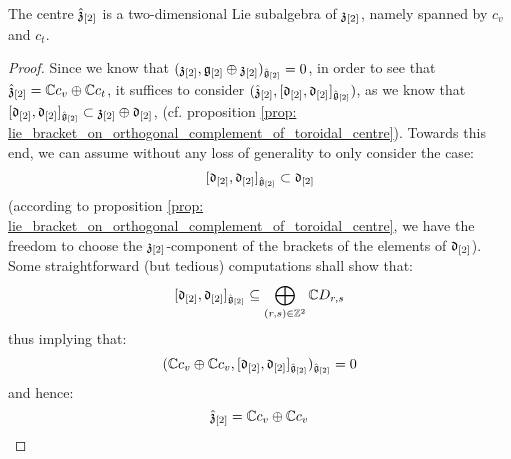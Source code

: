         \begin{proposition} \label{prop: centres_of_extended_toroidal_lie_algebras}
            The centre $\hat{\mathfrak{z}}_{[2]}$ is a two-dimensional Lie subalgebra of $\mathfrak{z}_{[2]}$, namely spanned by $c_v$ and $c_t$. 
        \end{proposition}
            \begin{proof}
                Since we know that $(\mathfrak{z}_{[2]}, \mathfrak{g}_{[2]} \oplus \mathfrak{z}_{[2]})_{\hat{\mathfrak{g}}_{[2]}} = 0$, in order to see that $\hat{\mathfrak{z}}_{[2]} = \mathbb{C} c_v \oplus \mathbb{C} c_t$, it suffices to consider $(\hat{\mathfrak{z}}_{[2]}, [\mathfrak{d}_{[2]}, \mathfrak{d}_{[2]}]_{\hat{\mathfrak{g}}_{[2]}})$, as we know that $[\mathfrak{d}_{[2]}, \mathfrak{d}_{[2]}]_{\hat{\mathfrak{g}}_{[2]}} \subset \mathfrak{z}_{[2]} \oplus \mathfrak{d}_{[2]}$, (cf. proposition \ref{prop: lie_bracket_on_orthogonal_complement_of_toroidal_centre}). Towards this end, we can assume without any loss of generality to only consider the case:
                    $$[\mathfrak{d}_{[2]}, \mathfrak{d}_{[2]}]_{\hat{\mathfrak{g}}_{[2]}} \subset \mathfrak{d}_{[2]}$$
                (according to proposition \ref{prop: lie_bracket_on_orthogonal_complement_of_toroidal_centre}, we have the freedom to choose the $\mathfrak{z}_{[2]}$-component of the brackets of the elements of $\mathfrak{d}_{[2]}$). Some straightforward (but tedious) computations shall show that:
                    $$[\mathfrak{d}_{[2]}, \mathfrak{d}_{[2]}]_{\hat{\mathfrak{g}}_{[2]}} \subseteq \bigoplus_{(r, s) \in \mathbb{Z}^2} \mathbb{C} D_{r, s}$$
                thus implying that:
                    $$(\mathbb{C} c_v \oplus \mathbb{C} c_v, [\mathfrak{d}_{[2]}, \mathfrak{d}_{[2]}]_{\hat{\mathfrak{g}}_{[2]}})_{\hat{\mathfrak{g}}_{[2]}} = 0$$
                and hence:
                    $$\hat{\mathfrak{z}}_{[2]} = \mathbb{C} c_v \oplus \mathbb{C} c_v$$
            \end{proof}